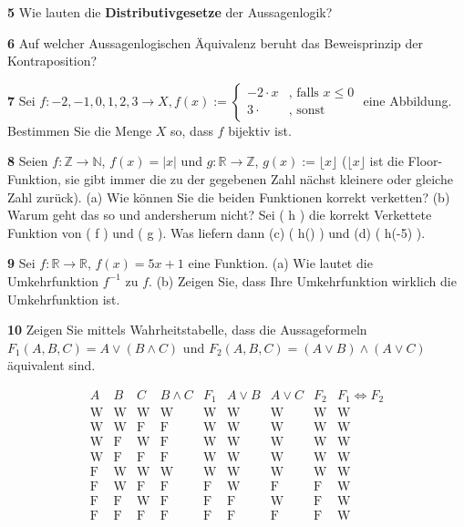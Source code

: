 \documentclass[11pt]{article}
\begin{document}
    \textbf{5} Wie lauten die \textbf{Distributivgesetze} der Aussagenlogik?

    \textbf{6} Auf welcher Aussagenlogischen Äquivalenz beruht das Beweisprinzip der Kontraposition?

    \textbf{7} Sei $f : {-2,-1,0,1,2,3} \rightarrow X, f(x) :=  \begin{cases}
                                                                    -2 \cdot x & \text{, falls $x \leq 0$} \\
                                                                    3 \cdot & \text{, sonst}
    \end{cases}$ eine Abbildung. Bestimmen Sie die Menge $X$ so, dass $f$ bijektiv ist.

    \textbf{8} Seien \( f : \mathbb{Z} \rightarrow \mathbb{N} \), \( f(x) = |x| \) und \( g : \mathbb{R} \rightarrow \mathbb{Z} \), \( g(x) := \lfloor x \rfloor \) (\(\lfloor x \rfloor\) ist die Floor-Funktion, sie gibt immer die zu der gegebenen Zahl nächst kleinere oder gleiche Zahl zurück).
    (a) Wie können Sie die beiden Funktionen korrekt verketten? (b) Warum geht das so und andersherum nicht?
    Sei ( h ) die korrekt Verkettete Funktion von ( f ) und ( g ). Was liefern dann (c) ( h(\pi) ) und (d) ( h(-5) ).

    \textbf{9} Sei \( f : \mathbb{R} \rightarrow \mathbb{R} \), \( f(x) = 5x + 1 \) eine Funktion. (a) Wie lautet die Umkehrfunktion $f^{-1}$ zu $f$. (b) Zeigen Sie, dass Ihre Umkehrfunktion wirklich die Umkehrfunktion ist.

    \textbf{10} Zeigen Sie mittels Wahrheitstabelle, dass die Aussageformeln \(F_1(A,B,C) = A \lor (B \land C)\) und \(F_2(A,B,C) = (A \lor B) \land (A \lor C)\) äquivalent sind.

\[
    \begin{array}{ccc|c|c|c|c|c|c|c}
        A & B & C & B \land C & F_1 & A \lor B & A \lor C & F_2 & F_1 \Leftrightarrow F_2 \\
        \hline
        \text{W} & \text{W} & \text{W} & \text{W} & \text{W} & \text{W} & \text{W} & \text{W} & \text{W} \\
        \text{W} & \text{W} & \text{F} & \text{F} & \text{W} & \text{W} & \text{W} & \text{W} & \text{W} \\
        \text{W} & \text{F} & \text{W} & \text{F} & \text{W} & \text{W} & \text{W} & \text{W} & \text{W} \\
        \text{W} & \text{F} & \text{F} & \text{F} & \text{W} & \text{W} & \text{W} & \text{W} & \text{W} \\
        \text{F} & \text{W} & \text{W} & \text{W} & \text{W} & \text{W} & \text{W} & \text{W} & \text{W} \\
        \text{F} & \text{W} & \text{F} & \text{F} & \text{F} & \text{W} & \text{F} & \text{F} & \text{W} \\
        \text{F} & \text{F} & \text{W} & \text{F} & \text{F} & \text{F} & \text{W} & \text{F} & \text{W} \\
        \text{F} & \text{F} & \text{F} & \text{F} & \text{F} & \text{F} & \text{F} & \text{F} & \text{W} \\
    \end{array}
\]
\end{document}
